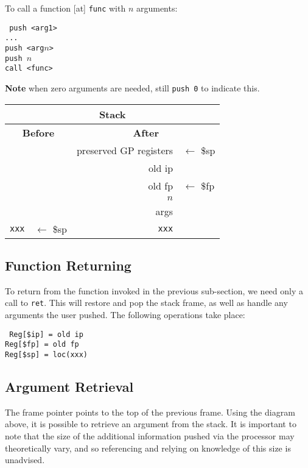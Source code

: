 \documentclass{article}
\begin{document}
To call a function [at] \texttt{func} with \(n\) arguments:

\medskip
\texttt{%
push <arg1>\\%
...\\%
push <arg\(n\)>\\%
push \(n\)\\%
call <func>
}

\textbf{Note} when zero arguments are needed, still \texttt{push 0} to indicate this.
\medskip

\begin{tabular}{|r l||r l|}
     \hline
     \multicolumn{4}{|c|}{\textbf{Stack}} \\
     \hline
     \multicolumn{2}{|c||}{\textbf{Before}} & \multicolumn{2}{c|}{\textbf{After}} \\
     \hline
     & & preserved GP registers & \(\leftarrow\) \$sp \\
     & & old ip & \\
     & & old fp & \(\leftarrow\) \$fp \\
     & & \(n\) & \\
     & & args & \\
     \texttt{xxx} & \(\leftarrow\) \$sp & \texttt{xxx} & \\
     \hline
\end{tabular}

\subsection{Function Returning}

To return from the function invoked in the previous sub-section, we need only a call to \texttt{ret}.
This will restore and pop the stack frame, as well as handle any arguments the user pushed.
The following operations take place:

\texttt{%
Reg[\$ip] = old ip\\%
Reg[\$fp] = old fp\\%
Reg[\$sp] = loc(xxx)\\%
}

\subsection{Argument Retrieval}

The frame pointer points to the top of the previous frame.
Using the diagram above, it is possible to retrieve an argument from the stack.
It is important to note that the size of the additional information pushed via the processor may theoretically vary, and so referencing and relying on knowledge of this size is unadvised.
\end{document}
